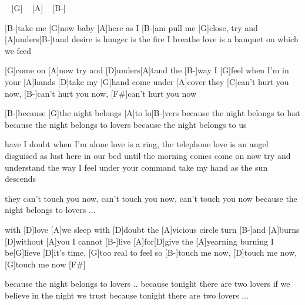 \begin{guitar}
[B-] ~ [G] ~ [A] ~ [B-]

[B-]take me [G]now baby [A]here as I [B-]am
pull me [G]close, try and [A]unders[B-]tand
desire is hunger is the fire I breathe
love is a banquet on which we feed


[G]come on [A]now try and [D]unders[A]tand
the [B-]way I [G]feel when I'm in your [A]hands
[D]take my [G]hand come under [A]cover
they [C]can't hurt you now, [B-]can't hurt you now, [F#]can't hurt you now

[B-]because [G]the night belongs [A]to lo[B-]vers
because the night belongs to lust
because the night belongs to lovers
because the night belongs to us

have I doubt when I'm alone
love is a ring, the telephone
love is an angel disguised as lust
here in our bed until the morning comes
come on now try and understand
the way I feel under your command
take my hand as the sun descends

they can't touch you now,
can't touch you now, can't touch you now
because the night belongs to lovers ...

with [D]love [A]we sleep
with [D]doubt the [A]vicious circle turn [B-]and [A]burns
[D]without [A]you I cannot [B-]live
[A]for[D]give the [A]yearning burning
I be[G]lieve [D]it's time, [G]too real to feel
so [B-]touch me now, [D]touch me now, [G]touch me now [F#]

because the night belongs to lovers ..
because tonight there are two lovers
if we believe in the night we trust
because tonight there are two lovers ...

\end{guitar}